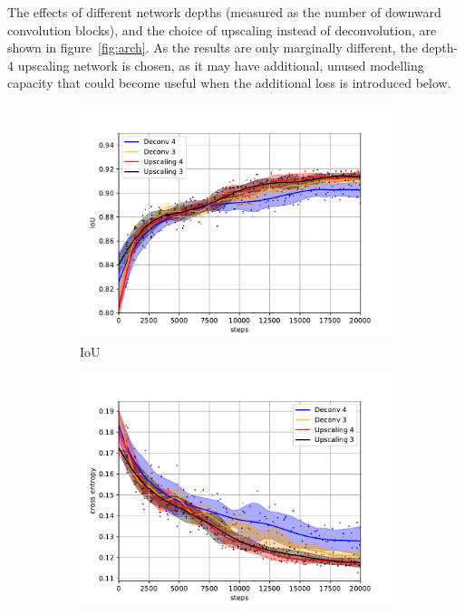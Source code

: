 \documentclass[aps,prl,twocolumn,groupedaddress,amsmath,amssymb]{revtex4-1}
\begin{document}
    The effects of different network depths (measured as the number of downward convolution blocks),
    and the choice of upscaling instead of deconvolution, are shown in figure~\ref{fig:arch}. As the
    results are only marginally different, the depth-4 upscaling network is chosen, as it may have
    additional, unused modelling capacity that could become useful when the additional loss is
    introduced below.

    \begin{figure}[tbp]
        \begin{subfigure}[c]{\linewidth}
            \includegraphics[width=\linewidth]{figures/arch.pdf}
            \caption{IoU}
        \end{subfigure}
        \begin{subfigure}[c]{\linewidth}
            \includegraphics[width=\linewidth]{figures/arch_xent.pdf}

\end{subfigure}
\end{figure}
\end{document}
